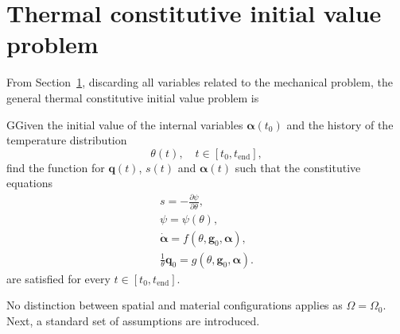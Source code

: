 \section{Thermal constitutive initial value problem}

From Section~\ref{}, discarding all variables related to the mechanical problem, the general thermal constitutive initial value problem is
\begin{problem}
GGiven the initial value of the internal variables \(\bm \alpha(t_0)\) and the history of the temperature distribution
\[\theta(t),\quad t\in[t_0, t_\text{end}],\]
find the function for $\bm q(t)$, \(s(t)\) and \(\bm \alpha(t)\) such that the constitutive equations
\begin{gather}
    s = -\frac{\partial \psi}{\partial \theta},\label{eq:entropy_constitutive_relation}\\
    \psi = \psi(\theta),\\
    \dot{\bm \alpha} = f(\theta, \bm g_0, \bm \alpha),\\
    \frac{1}{\theta}\bm q_0 = g(\theta, \bm g_0, \bm \alpha).
\end{gather}
are satisfied for every $t\in [t_0, t_\text{end}]$.
\end{problem}
No distinction between spatial and material configurations applies as \(\Omega = \Omega_0\).
Next, a standard set of assumptions are introduced.

